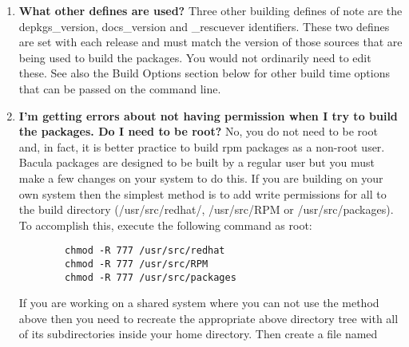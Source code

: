 \begin{enumerate}
\begin{verbatim}
\end{verbatim}
\normalsize

to

\footnotesize
\begin{verbatim}
        %define mysql 1
        OR
        %define mysql4 1
        OR
        %define mysql5 1

\end{verbatim}
\normalsize

in the spec file directly or pass it to rpmbuild on the command line:

\footnotesize
\begin{verbatim}
        rpmbuild -ba --define "build_rh7 1" --define "build_mysql 1" bacula.spec
        rpmbuild -ba --define "build_rh7 1" --define "build_mysql4 1" bacula.spec
        rpmbuild -ba --define "build_rh7 1" --define "build_mysql5 1" bacula.spec

\end{verbatim}
\normalsize

\item
   \label{faq3}
   {\bf What other defines are used?}
   Three other building defines of note are the depkgs\_version, docs\_version and
   \_rescuever identifiers. These  two defines are set with each release and must
   match the version of those sources that are being used to build the packages.
   You would not ordinarily need to edit these.  See also the Build Options section
   below for other build time options that can be passed on the command line.
\item
   \label{faq4}
   {\bf I'm getting errors about not having permission when I try  to build the
   packages. Do I need to be root?}
   No, you do not need to be root and, in fact, it is better practice to
   build rpm packages as a non-root user.  Bacula packages are designed to
   be built by a regular user but you must make a few changes on your
   system to do this.  If you are building on your own system then the
   simplest method is to add write permissions for all to the build
   directory (/usr/src/redhat/, /usr/src/RPM or /usr/src/packages).
   To accomplish this, execute the following command as root:

\footnotesize
\begin{verbatim}
        chmod -R 777 /usr/src/redhat
        chmod -R 777 /usr/src/RPM
        chmod -R 777 /usr/src/packages

\end{verbatim}
\normalsize

If you are working on a shared system where you can not use the method
above then you need to recreate the appropriate above directory tree with all
of its subdirectories inside your home directory.  Then create a file named


\end{enumerate}
